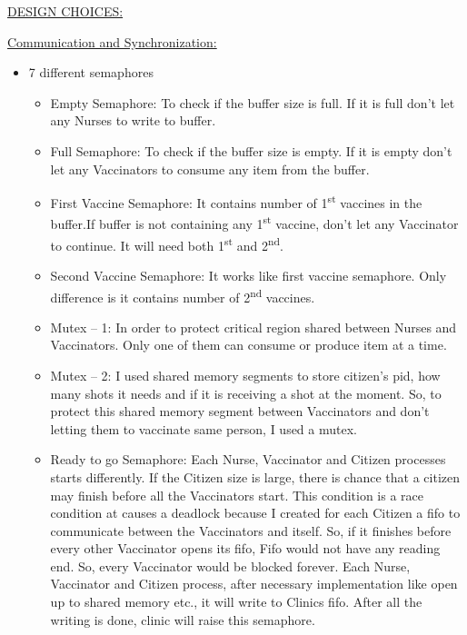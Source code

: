 \documentclass[12pt]{report}
\renewcommand{\_}{\kern-1.5pt\textunderscore\kern-1.5pt}
\begin{document}
\vspace{\baselineskip}
\begin{justify}
{\fontsize{16pt}{19.2pt}\selectfont \uline{DESIGN CHOICES:}}
\end{justify}
\begin{justify}
{\fontsize{14pt}{16.8pt}\selectfont \uline{Communication and Synchronization:}}
\end{justify}
\begin{itemize}
	\item 7 different semaphores
\setlength{\parskip}{0.0pt}
\begin{itemize}
	\item Empty Semaphore: To check if the buffer size is full. If it is full don’t let any Nurses to write to buffer.

\vspace{\baselineskip}
	\item Full Semaphore: To check if the buffer size is empty. If it is empty don’t let any Vaccinators to consume any item from the buffer.

\vspace{\baselineskip}
	\item First Vaccine Semaphore: It contains number of 1\textsuperscript{st} vaccines in the buffer.If buffer is not containing any 1\textsuperscript{st} vaccine, don’t let any Vaccinator to continue. It will need both 1\textsuperscript{st} and 2\textsuperscript{nd}.

\vspace{\baselineskip}
	\item Second Vaccine Semaphore: It works like first vaccine semaphore. Only difference is it contains number of 2\textsuperscript{nd} vaccines.

\vspace{\baselineskip}
	\item Mutex – 1: In order to protect critical region shared between Nurses and Vaccinators. Only one of them can consume or produce item at a time.

\vspace{\baselineskip}
	\item Mutex – 2: I used shared memory segments to store citizen’s pid, how many shots it needs and if it is receiving a shot at the moment. So, to protect this shared memory segment between Vaccinators and don’t letting them to vaccinate same person, I used a mutex.

\vspace{\baselineskip}
	\item Ready to go Semaphore: Each Nurse, Vaccinator and Citizen processes starts differently. If the Citizen size is large, there is chance that a citizen may finish before all the Vaccinators start. This condition is a race condition at causes a deadlock because I created for each Citizen a fifo to communicate between the Vaccinators and itself. So, if it finishes before every other Vaccinator opens its fifo, Fifo would not have any reading end. So, every Vaccinator would be blocked forever. Each Nurse, Vaccinator and Citizen process, after necessary implementation like open up to shared memory etc., it will write to Clinics fifo. After all the writing is done, clinic will raise this semaphore.


\end{itemize}
\end{itemize}
\end{document}
